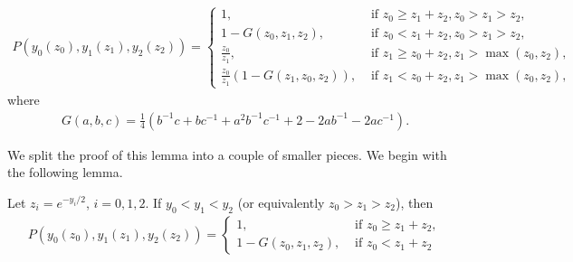 \begin{lemma}\label{lem:triangle_prob_y_coordinates}
\begin{align*}
P(y_0(z_0),y_1(z_1),y_2(z_2)) = \begin{cases}
	1, &\text{ if } z_0 \geq z_1+z_2, z_0 > z_1 > z_2, \\
	1-G(z_0,z_1,z_2), &\text{ if } z_0 < z_1+z_2, z_0 > z_1 > z_2, \\
	\frac{z_0}{z_1}, &\text{ if } z_1 \geq z_0+z_2, z_1 > \max(z_0,z_2), \\
	\frac{z_0}{z_1}\left(1-G(z_1,z_0,z_2)\right), &\text{ if } z_1 < z_0+z_2, z_1 > \max(z_0,z_2),
\end{cases}
\end{align*}
where 
\begin{align*}
G(a,b,c) = \frac{1}{4}
\left( b^{-1}c + bc^{-1} + a^2b^{-1}c^{-1} + 2 - 2ab^{-1}-2ac^{-1}\right).
\end{align*}
\end{lemma}



We split the proof of this lemma into a couple of smaller pieces. We begin with the following lemma.

\begin{lemma}\label{lem:ordered}
Let $z_i = e^{-y_i/2}$, $i=0,1,2$. If $y_0<y_1<y_2$ (or equivalently $z_0 > z_1 > z_2$), then
\begin{align*}
P(y_0(z_0),y_1(z_1),y_2(z_2)) = \begin{cases}
1, &\text{ if } z_0 \geq z_1+z_2,  \\
1-G(z_0,z_1,z_2), &\text{ if } z_0 < z_1+z_2
\end{cases}
\end{align*}
\end{lemma}

